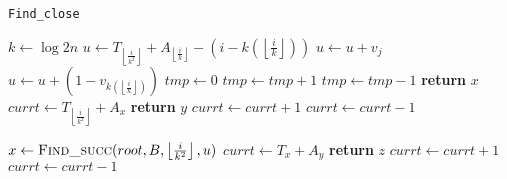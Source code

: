 \documentclass{article}
\begin{document}
    \begin{algorithm}
    \caption{\texttt{Find\_close}}\label{findclose}
    \begin{algorithmic}[1]
        \State $k\gets\log{2n}$
        \State $u\gets T_{\left\lfloor{\frac{i}{k^2}}\right\rfloor}+A_{\left\lfloor{\frac{i}{k}}\right\rfloor}-(i-k(\left\lfloor{\frac{i}{k}}\right\rfloor))$
            \State $u\gets u+v_j$
        \EndFor
        \State $u\gets u+(1-v_{k(\left\lfloor{\frac{i}{k}}\right\rfloor)})$
        \State
        \State $tmp\gets 0$
                \State $tmp\gets tmp+1$
            \Else  
                \State $tmp\gets tmp-1$
            \EndIf
                \State \textbf{return} $x$
            \EndIf
        \EndFor
        \State
                \State $currt\gets T_{\left\lfloor{\frac{i}{k^2}}\right\rfloor}+A_x$
                        \State \textbf{return} $y$
                    \EndIf
                        \State $currt\gets currt+1$
                    \EndIf
                        \State $currt\gets currt-1$
                    \EndIf
                \EndFor
    \end{algorithmic}
    \end{algorithm}
    \begin{algorithm}
    \begin{algorithmic}[1]
            \EndIf
        \EndFor
        \State
        \State $x\gets \Call{Find\_succ}{root,B,\left\lfloor{\frac{i}{k^2}}\right\rfloor,u}$ 
                \State $currt\gets T_x+A_y$
                        \State \textbf{return} $z$
                    \EndIf
                        \State $currt\gets currt+1$
                    \EndIf
                        \State $currt\gets currt-1$
                    \EndIf
                \EndFor
            \EndIf
        \EndFor
    \EndProcedure
    \end{algorithmic}
    \end{algorithm}
    
\end{document}
